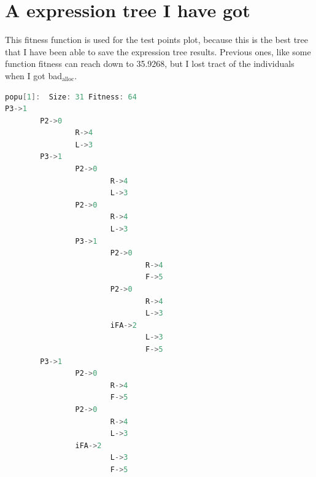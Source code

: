 \documentclass[10pt,b5paper]{article}
\begin{document}
\section{A expression tree I have got}
\label{sec-5}
This fitness function is used for the test points plot, because this is the best tree that I have been able to save the expression tree results. Previous ones, like some function fitness can reach down to 35.9268, but I lost tract of the individuals when I got bad$_{\text{alloc}}$. 
\begin{lstlisting}[language=c++]
popu[1]:  Size: 31 Fitness: 64
P3->1
        P2->0
                R->4
                L->3
        P3->1
                P2->0
                        R->4
                        L->3
                P2->0
                        R->4
                        L->3
                P3->1
                        P2->0
                                R->4
                                F->5
                        P2->0
                                R->4
                                L->3
                        iFA->2
                                L->3
                                F->5
        P3->1
                P2->0
                        R->4
                        F->5
                P2->0
                        R->4
                        L->3
                iFA->2
                        L->3
                        F->5
\end{lstlisting}
\end{document}
